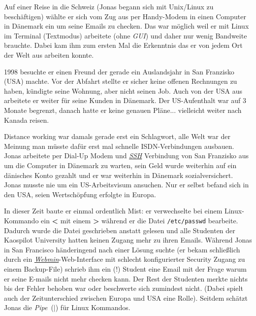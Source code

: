 \documentclass[10pt,a4paper,ngerman,twoside]{article} %
\begin{document}
Auf einer Reise in die Schweiz (Jonas begann sich mit Unix/Linux zu beschäftigen) wählte er sich vom Zug aus per Handy-Modem in einen Computer in Dänemark ein um seine Emails zu checken. Das war möglich weil er mit Linux im Terminal (Textmodus) arbeitete (ohne \textit{GUI}) und daher nur wenig Bandweite brauchte. Dabei kam ihm zum ersten Mal die Erkenntnis das er von jedem Ort der Welt aus arbeiten konnte.

1998 besuchte er einen Freund der gerade ein Auslandsjahr in San Franzisko (USA) machte. Vor der Abfahrt stellte er sicher keine offenen Rechnungen zu haben, kündigte seine Wohnung, aber nicht seinen Job. Auch von der USA aus arbeitete er weiter für seine Kunden in Dänemark. Der US-Aufenthalt war auf 3 Monate begrenzt, danach hatte er keine genauen Pläne... vielleicht weiter nach Kanada reisen. 

Distance working war damals gerade erst ein Schlagwort, alle Welt war der Meinung man müsste dafür erst mal schnelle ISDN-Verbindungen ausbauen. Jonas arbeitete per Dial-Up Modem und \href{http://de.wikipedia.org/wiki/Secure_Shell}{\textit{SSH}} Verbindung von San Franzisko aus um die Computer in Dänemark zu warten, sein Geld wurde weiterhin auf ein dänisches Konto gezahlt und er war weiterhin in Dänemark sozialversichert. Jonas musste nie um ein US-Arbeitsvisum ansuchen. Nur er selbst befand sich in den USA, seien Wertschöpfung erfolgte in Europa.

In dieser Zeit baute er einmal ordentlich Mist: er verwechselte bei einem Linux-Kommando ein \textbf{\textless} mit einem \textbf{\textgreater} während er die Datei \texttt{/etc/passwd} bearbeite. Dadurch wurde die Datei geschrieben anstatt gelesen und alle Studenten der Kaospilot University hatten keinen Zugang mehr zu ihren Emails. Während Jonas in San Francisco händeringend nach einer Lösung suchte (er bekam schließlich durch ein \href{https://en.wikipedia.org/wiki/Webmin}{\textit{Webmin}}-Web-Interface mit schlecht konfigurierter Security Zugang zu einem Backup-File) schrieb ihm ein (!) Student eine Email mit der Frage warum er seine E-mails nicht mehr checken kann. Der Rest der Studenten merkte nichts bis der Fehler behoben war oder beschwerte sich zumindest nicht. (Dabei spielt auch der Zeitunterschied zwischen Europa und USA eine Rolle). Seitdem schätzt Jonas die \textit{Pipe}\ (\textbf{$|$}) für Linux Kommandos.
\end{document}
